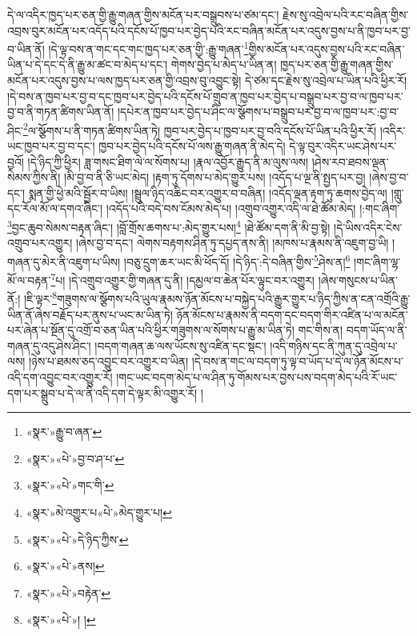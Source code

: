 དེ་ལ་འདིར་ཁྱད་པར་ཅན་གྱི་རྒྱུ་གཞན་གྱིས་མངོན་པར་བསྒྲུབས་པ་ཙམ་དང་། རྗེས་སུ་འབྲེལ་པའི་རང་བཞིན་གྱིས་འབྲས་བུར་མངོན་པར་འདོད་པའི་དངོས་པོ་ཁྱབ་པར་བྱེད་པའི་རང་བཞིན་མངོན་པར་འདུས་བྱས་པ་ནི་ཁྱབ་པར་བྱ་བ་ཡིན་ནོ། །དེ་ལྟ་བས་ན་གང་དང་གང་ཁྱད་པར་ཅན་གྱི་:རྒྱུ་གཞན་\footnote{«སྣར་»རྒྱུ་བ་ཞན་}གྱིས་མངོན་པར་འདུས་བྱས་པའི་རང་བཞིན་ཡིན་པ་དེ་དང་དེ་ནི་རྒྱུ་མ་ཚང་བ་མེད་པ་དང་། གེགས་བྱེད་པ་མེད་པ་ཡིན་ན། ཁྱད་པར་ཅན་གྱི་རྒྱུ་གཞན་གྱིས་མངོན་པར་འདུས་བྱས་པ་ལས་ཁྱད་པར་ཅན་གྱི་འབྲས་བུ་འབྱུང་སྟེ། དེ་ཙམ་དང་རྗེས་སུ་འབྲེལ་པ་ཡིན་པའི་ཕྱིར་རོ། །དེ་བས་ན་ཁྱབ་པར་བྱ་བ་དང་ཁྱབ་པར་བྱེད་པའི་དངོས་པོ་གྲུབ་ན་ཁྱབ་པར་བྱེད་པ་བསྒྲུབ་པར་བྱ་བ་ལ་ཁྱབ་པར་བྱ་བ་ནི་གཏན་ཚིགས་ཡིན་ནོ། །དཔེར་ན་ཁྱབ་པར་བྱེད་པ་ཤིང་ལ་སྩོགས་པ་བསྒྲུབ་པར་བྱ་བ་ལ་ཁྱབ་པར་:བྱ་བ་ཤིང་\footnote{«སྣར་»«པེ་»བྱ་བ་ཤ་པ་}ལ་སྩོགས་པ་ནི་གཏན་ཚིགས་ཡིན་ཏེ། ཁྱབ་པར་བྱེད་པ་ཁྱབ་པར་བྱ་བའི་དངོས་པོ་ཡིན་པའི་ཕྱིར་རོ། །འདིར་ཡང་ཁྱབ་པར་བྱ་བ་དང་། ཁྱབ་པར་བྱེད་པའི་དངོས་པོ་ལས་རྒྱུ་གཞན་ནི་མེད་དེ། དེ་ལྟ་བུར་འདིར་ཡང་ཤེས་པར་བྱའོ། །དེ་ཉིད་ཀྱི་ཕྱིར། ཟླ་གསང་ཐིག་ལེ་ལ་སོགས་པ། །རྣལ་འབྱོར་རྒྱུད་ནི་མ་ལུས་ལས། །ཤེས་རབ་ཐབས་ལྡན་སེམས་ཀྱིས་ནི། །མི་བྱ་བ་ནི་ཅི་ཡང་མེད། །རྟག་ཏུ་དོགས་པ་མེད་གྱུར་པས། །འདོད་པ་ལྔ་ནི་སྤྱད་པར་བྱ། །ཞེས་བྱ་བ་དང་། སྨན་གྱི་ཕྱེ་མའི་སྦྱོར་བ་ཡིས། །སྦྲུལ་ཉིད་འཆིང་བར་འགྱུར་བ་བཞིན། །འདོད་ལྡན་རྟག་ཏུ་ཆགས་བྱེད་ལ། །གླུ་དང་རོལ་མོ་ལ་དགའ་ཞིང་། །འདོད་པའི་བདེ་བས་ངོམས་མེད་པ། །འགྲུབ་འགྱུར་འདི་ལ་ཐེ་ཚོམ་མེད། །:གང་ཞིག་\footnote{«སྣར་»«པེ་»གང་གི་}བྱང་ཆུབ་སེམས་བརྟན་ཞིང་། །བློ་གྲོས་ཆགས་པ་:མེད་གྱུར་པས།\footnote{«སྣར་»མེ་འགྱུར་པ«པེ་»མེད་གྱུར་པ།} །ཐེ་ཚོམ་དག་ནི་མི་བྱ་སྟེ། །དེ་ཡིས་འདིར་ངེས་འགྲུབ་པར་འགྱུར། །ཞེས་བྱ་བ་དང་། ལེགས་བརྟགས་ཤིན་ཏུ་དཔྱད་ནས་ནི། །མཁས་པ་རྣམས་ནི་འཇུག་བྱ་ཡི། །གཞན་དུ་མེར་ནི་འཇུག་པ་ཡིས། །བཅུ་དྲུག་ཆར་ཡང་མི་ཕོད་དོ། །དེ་ཉིད་:དེ་བཞིན་གྱིས་\footnote{«སྣར་»«པེ་»དེ་ཉིད་ཀྱིས་}ཤེས་ན།\footnote{«སྣར་»«པེ་»ནས།} །གང་ཞིག་ལྷ་མོ་ལ་བརྟན་\footnote{«སྣར་»«པེ་»བརྟེན་}པ། །དེ་འགྲུབ་འགྱུར་གྱི་གཞན་དུ་ནི། །དམྱལ་བ་ཆེན་པོར་ལྟུང་བར་འགྱུར། །ཞེས་གསུངས་པ་ཡིན་ནོ:། །ཇི་ལྟར་\footnote{«སྣར་»«པེ་»། །}གཟུགས་ལ་སྩོགས་པའི་ཡུལ་རྣམས་ཉོན་མོངས་པ་བསྐྱེད་པའི་རྒྱུར་གྱུར་པ་ཉིད་ཀྱིས་ན་ངན་འགྲོའི་རྒྱུ་ཡིན་ནོ་ཞེས་བརྗོད་པར་ནུས་པ་ཡང་མ་ཡིན་ཏེ། ཉོན་མོངས་པ་རྣམས་ནི་བདག་དང་བདག་གིར་འཛིན་པ་ལ་མངོན་པར་ཞེན་པ་སྔོན་དུ་འགྲོ་བ་ཅན་ཡིན་པའི་ཕྱིར་གཟུགས་ལ་སོགས་པ་རྒྱུ་མ་ཡིན་ཏེ། གང་གིས་ན། བདག་ཡོད་ལ་ནི་གཞན་དུ་འདུ་ཤེས་ཤིང་། །བདག་གཞན་ཆ་ལས་ཡོངས་སུ་འཛིན་དང་སྡང་། །འདི་གཉིས་དང་ནི་ཀུན་དུ་འབྲེལ་པ་ལས། །ཉེས་པ་ཐམས་ཅད་འབྱུང་བར་འགྱུར་བ་ཡིན། །དེ་བས་ན་གང་ལ་བདག་ཏུ་ལྟ་བ་ཡོད་པ་དེ་ལ་ཉོན་མོངས་པ་འདི་དག་འབྱུང་བར་འགྱུར་རོ། །གང་ཡང་བདག་མེད་པ་ལ་ཤིན་ཏུ་གོམས་པར་བྱས་པས་བདག་མེད་པའི་རོ་ཡང་དག་པར་སྒྲུབ་པ་དེ་ལ་ནི་འདི་དག་དེ་ལྟར་མི་འགྱུར་རོ། །
